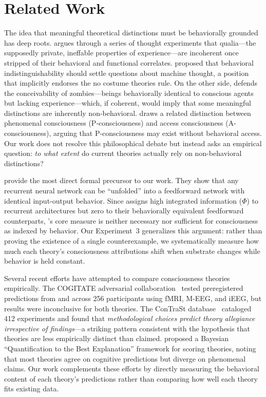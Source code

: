 \section{Related Work}
\label{sec:related}

The idea that meaningful theoretical distinctions must be behaviorally grounded has deep roots.
\citet{dennett1988quining} argues through a series of thought experiments that qualia---the supposedly private, ineffable properties of experience---are incoherent once stripped of their behavioral and functional correlates.
\citet{turing1950computing} proposed that behavioral indistinguishability should settle questions about machine thought, a position that implicitly endorses the no costume theories rule.
On the other side, \citet{chalmers2018meta} defends the conceivability of zombies---beings behaviorally identical to conscious agents but lacking experience---which, if coherent, would imply that some meaningful distinctions are inherently non-behavioral.
\citet{block1995confusion} draws a related distinction between phenomenal consciousness (P-consciousness) and access consciousness (A-consciousness), arguing that P-consciousness may exist without behavioral access.
Our work does not resolve this philosophical debate but instead asks an empirical question: \emph{to what extent} do current theories actually rely on non-behavioral distinctions?

\citet{doerig2019unfolding} provide the most direct formal precursor to our work.
They show that any recurrent neural network can be ``unfolded'' into a feedforward network with identical input-output behavior.
Since \IIT assigns high integrated information ($\Phi$) to recurrent architectures but zero to their behaviorally equivalent feedforward counterparts, \IIT's core measure is neither necessary nor sufficient for consciousness as indexed by behavior.
Our Experiment~3 generalizes this argument: rather than proving the existence of a single counterexample, we systematically measure how much each theory's consciousness attributions shift when substrate changes while behavior is held constant.

Several recent efforts have attempted to compare consciousness theories empirically.
The COGITATE adversarial collaboration~\citep{melloni2023adversarial} tested preregistered predictions from \IIT and \GNW across 256 participants using fMRI, M-EEG, and iEEG, but results were inconclusive for both theories.
The ConTraSt database~\citep{yaron2022contrast} cataloged 412 experiments and found that \emph{methodological choices predict theory allegiance irrespective of findings}---a striking pattern consistent with the hypothesis that theories are less empirically distinct than claimed.
\citet{kirkeby2024quantifying} proposed a Bayesian ``Quantification to the Best Explanation'' framework for scoring theories, noting that most theories agree on cognitive predictions but diverge on phenomenal claims.
Our work complements these efforts by directly measuring the behavioral content of each theory's predictions rather than comparing how well each theory fits existing data.

